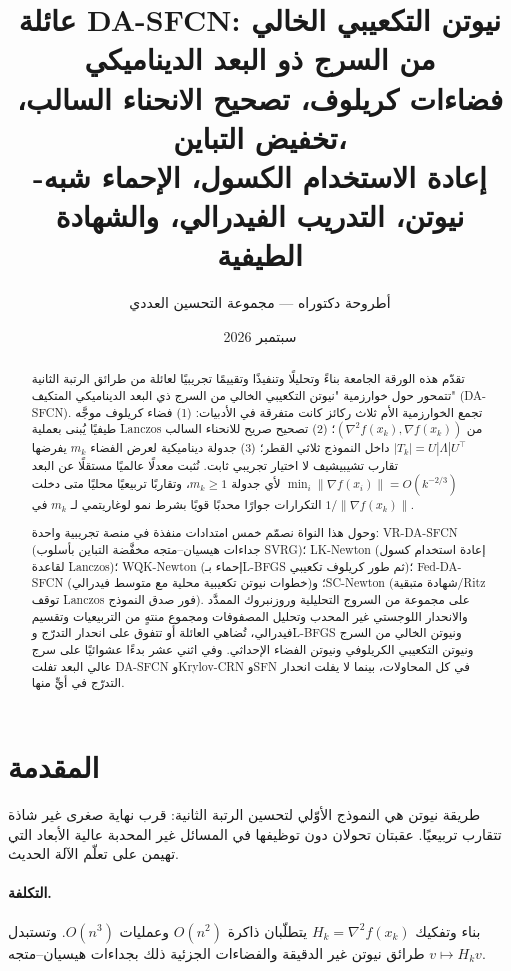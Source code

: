 \documentclass[12pt,a4paper]{article}
\title{\textbf{عائلة DA-SFCN: نيوتن التكعيبي الخالي من السرج ذو البعد الديناميكي}\\[6pt]
\large فضاءات كريلوف، تصحيح الانحناء السالب، تخفيض التباين،\\
إعادة الاستخدام الكسول، الإحماء شبه-نيوتن، التدريب الفيدرالي، والشهادة الطيفية}
\author{أطروحة دكتوراه --- مجموعة التحسين العددي}
\date{سبتمبر 2026}
\theoremstyle{definition}
\begin{document}
\maketitle

\begin{abstract}
تقدّم هذه الورقة الجامعة بناءً وتحليلًا وتنفيذًا وتقييمًا تجريبيًا لعائلة
من طرائق الرتبة الثانية تتمحور حول خوارزمية
"نيوتن التكعيبي الخالي من السرج ذي البعد الديناميكي المتكيف"
\textenglish{(DA-SFCN)}.
تجمع الخوارزمية الأم ثلاث ركائز كانت متفرقة في الأدبيات:
(1) فضاء كريلوف موجَّه طيفيًا يُبنى بعملية \textenglish{Lanczos} من
$(\nabla^2 f(x_k),\nabla f(x_k))$؛
(2) تصحيح صريح للانحناء السالب $|T_k|=U|\Lambda|U^\top$ داخل النموذج
ثلاثي القطر؛
(3) جدولة ديناميكية لعرض الفضاء $m_k$ يفرضها تقارب تشيبيشيف لا اختيار
تجريبي ثابت.
نُثبت معدلًا عالميًا مستقلًا عن البعد
$\min_i\|\nabla f(x_i)\|=O(k^{-2/3})$ لأي جدولة $m_k\ge 1$،
وتقاربًا تربيعيًا محليًا متى دخلت التكرارات جوارًا محدبًا قويًا بشرط نمو
لوغاريتمي لـ $m_k$ في $1/\|\nabla f(x_k)\|$.

وحول هذا النواة نصمّم خمس امتدادات منفذة في منصة تجريبية واحدة:
\textenglish{VR-DA-SFCN} (جداءات هيسيان--متجه مخفَّضة التباين بأسلوب
\textenglish{SVRG})؛
\textenglish{LK-Newton} (إعادة استخدام كسول لقاعدة \textenglish{Lanczos})؛
\textenglish{WQK-Newton} (إحماء بـ\textenglish{L-BFGS} ثم طور كريلوف تكعيبي)؛
\textenglish{Fed-DA-SFCN} (خطوات نيوتن تكعيبية محلية مع متوسط فيدرالي)؛
و\textenglish{SC-Newton} (شهادة متبقية/\textenglish{Ritz} توقف \textenglish{Lanczos}
فور صدق النموذج).
على مجموعة من السروج التحليلية وروزنبروك الممدَّد والانحدار اللوجستي غير
المحدب وتحليل المصفوفات ومجموع منتهٍ من التربيعيات وتقسيم فيدرالي،
تُضاهي العائلة أو تتفوق على انحدار التدرّج و\textenglish{L-BFGS}
ونيوتن الخالي من السرج ونيوتن التكعيبي الكريلوفي ونيوتن الفضاء الإحداثي.
وفي اثني عشر بدءًا عشوائيًا على سرج عالي البعد تفلت
\textenglish{DA-SFCN} و\textenglish{Krylov-CRN} و\textenglish{SFN}
في كل المحاولات، بينما لا يفلت انحدار التدرّج في أيٍّ منها.
\end{abstract}

\section{المقدمة}
طريقة نيوتن هي النموذج الأوّلي لتحسين الرتبة الثانية: قرب نهاية صغرى غير
شاذة تتقارب تربيعيًا. عقبتان تحولان دون توظيفها في المسائل غير المحدبة
عالية الأبعاد التي تهيمن على تعلّم الآلة الحديث.

\paragraph{التكلفة.}
بناء وتفكيك $H_k=\nabla^2 f(x_k)$ يتطلّبان ذاكرة $O(n^2)$ وعمليات
$O(n^3)$. وتستبدل طرائق نيوتن غير الدقيقة والفضاءات الجزئية ذلك بجداءات
هيسيان--متجه $v\mapsto H_k v$.
\end{document}
